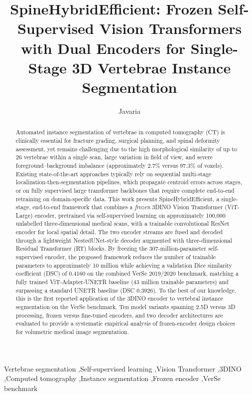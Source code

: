 \documentclass[preprint,12pt,3p]{elsarticle}
\begin{document}
\begin{frontmatter}

\title{SpineHybridEfficient: Frozen Self-Supervised Vision Transformers with Dual Encoders for Single-Stage 3D Vertebrae Instance Segmentation}

\author[msds]{Javaria}


\begin{abstract}
Automated instance segmentation of vertebrae in computed tomography (CT) is clinically essential for fracture grading, surgical planning, and spinal deformity assessment, yet remains challenging due to the high morphological similarity of up to 26 vertebrae within a single scan, large variation in field of view, and severe foreground--background imbalance (approximately 2.7\% versus 97.3\% of voxels). Existing state-of-the-art approaches typically rely on sequential multi-stage localization-then-segmentation pipelines, which propagate centroid errors across stages, or on fully supervised large transformer backbones that require complete end-to-end retraining on domain-specific data. This work presents SpineHybridEfficient, a single-stage, end-to-end framework that combines a \emph{frozen} 3DINO Vision Transformer (ViT-Large) encoder, pretrained via self-supervised learning on approximately 100{,}000 unlabelled three-dimensional medical scans, with a trainable convolutional ResNet encoder for local spatial detail. The two encoder streams are fused and decoded through a lightweight NestedUNet-style decoder augmented with three-dimensional Residual Transformer (RT) blocks. By freezing the 307-million-parameter self-supervised encoder, the proposed framework reduces the number of trainable parameters to approximately 10 million while achieving a validation Dice similarity coefficient (DSC) of 0.4160 on the combined VerSe 2019/2020 benchmark, matching a fully trained ViT-Adapter-UNETR baseline (43 million trainable parameters) and surpassing a standard UNETR baseline (DSC 0.3926). To the best of our knowledge, this is the first reported application of the 3DINO encoder to vertebral instance segmentation on the VerSe benchmark. Ten model variants spanning 2.5D versus 3D processing, frozen versus fine-tuned encoders, and two decoder architectures are evaluated to provide a systematic empirical analysis of frozen-encoder design choices for volumetric medical image segmentation.
\end{abstract}

\begin{keyword}
Vertebrae segmentation \sep Self-supervised learning \sep Vision Transformer \sep 3DINO \sep Computed tomography \sep Instance segmentation \sep Frozen encoder \sep VerSe benchmark
\end{keyword}

\end{frontmatter}
\end{document}
